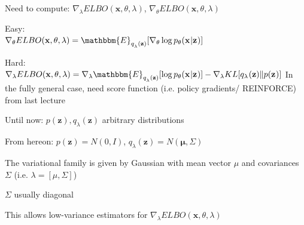 \documentclass{beamer}
\let\tempone\itemize
\let\temptwo\enditemize
\renewenvironment{itemize}{\tempone\addtolength{\itemsep}{0.5\baselineskip}}{\temptwo}
\newcommand{\zvec}{\mathbf{z}}
\newcommand{\E}{\mathbbm{E}}
\newcommand{\xvec}{\mathbf{x}}
\begin{document}
\begin{frame}
  \begin{center}
   \end{center}   
Need to compute:
$\nabla_\lambda ELBO(\xvec, \theta, \lambda)$, $\nabla_\theta ELBO(\xvec, \theta, \lambda)$
\begin{itemize}
\item Easy: \\ $\nabla_\theta ELBO(\xvec, \theta, \lambda) =  \E_{q_\lambda^{}(\zvec)}[
\nabla_\theta \log  p_\theta(\xvec^{} | \zvec^{})] $ 
\item Hard: \\
$\nabla_\lambda ELBO(\xvec, \theta, \lambda) =  \nabla_\lambda \E_{q_\lambda^{}(\zvec)}[\log  p_\theta(\xvec^{} | \zvec^{})] - \nabla_\lambda KL[q_{\lambda^{}}(\zvec) \Vert p(\zvec^{})] $ 
\end{itemize}
In the fully general case, need score function (i.e. policy gradients/ REINFORCE) from last lecture
\end{frame}

\begin{frame}
  \begin{center}
   \end{center}
   \begin{itemize}
\item Until now: $p(\zvec), q_\lambda(\zvec)$ arbitrary distributions \\
\item From hereon: $p(\zvec) = N(0, I)$, $ q_\lambda(\zvec) = N(\mathbf{\mu}, \Sigma)$
\item The variational family is given by Gaussian with mean vector $\mu$ and covariances $\Sigma$ (i.e. $\lambda = [\mu, \Sigma]$)
\item $\Sigma$ usually diagonal
\item This allows  low-variance estimators for $\nabla_\lambda ELBO(\xvec, \theta, \lambda) $
\end{itemize}
\end{frame}
\end{document}
